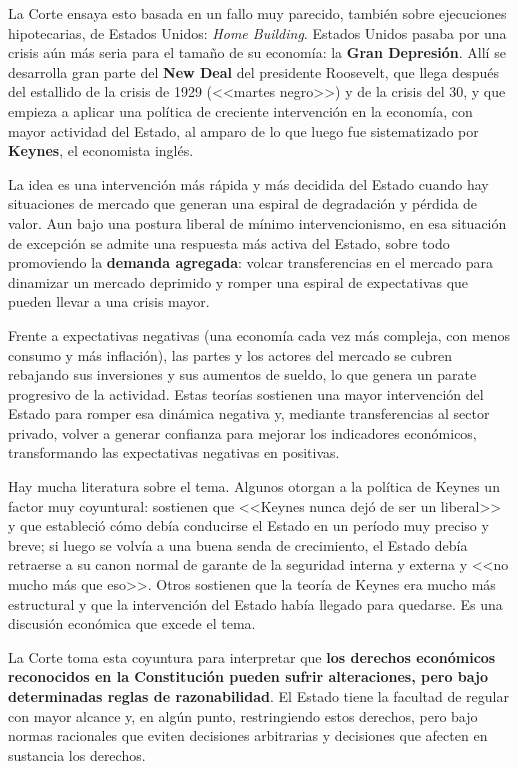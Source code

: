 \documentclass[12pt,oneside]{book}
\begin{document}

La Corte ensaya esto basada en un fallo muy parecido, también sobre ejecuciones hipotecarias, de Estados Unidos: \textit{Home Building}. Estados Unidos pasaba por una crisis aún más seria para el tamaño de su economía: la \textbf{Gran Depresión}. Allí se desarrolla gran parte del \textbf{New Deal} del presidente Roosevelt, que llega después del estallido de la crisis de 1929 (<<martes negro>>) y de la crisis del 30, y que empieza a aplicar una política de creciente intervención en la economía, con mayor actividad del Estado, al amparo de lo que luego fue sistematizado por \textbf{Keynes}, el economista inglés.

La idea es una intervención más rápida y más decidida del Estado cuando hay situaciones de mercado que generan una espiral de degradación y pérdida de valor. Aun bajo una postura liberal de mínimo intervencionismo, en esa situación de excepción se admite una respuesta más activa del Estado, sobre todo promoviendo la \textbf{demanda agregada}: volcar transferencias en el mercado para dinamizar un mercado deprimido y romper una espiral de expectativas que pueden llevar a una crisis mayor.

Frente a expectativas negativas (una economía cada vez más compleja, con menos consumo y más inflación), las partes y los actores del mercado se cubren rebajando sus inversiones y sus aumentos de sueldo, lo que genera un parate progresivo de la actividad. Estas teorías sostienen una mayor intervención del Estado para romper esa dinámica negativa y, mediante transferencias al sector privado, volver a generar confianza para mejorar los indicadores económicos, transformando las expectativas negativas en positivas.

Hay mucha literatura sobre el tema. Algunos otorgan a la política de Keynes un factor muy coyuntural: sostienen que <<Keynes nunca dejó de ser un liberal>> y que estableció cómo debía conducirse el Estado en un período muy preciso y breve; si luego se volvía a una buena senda de crecimiento, el Estado debía retraerse a su canon normal de garante de la seguridad interna y externa y <<no mucho más que eso>>. Otros sostienen que la teoría de Keynes era mucho más estructural y que la intervención del Estado había llegado para quedarse. Es una discusión económica que excede el tema.

\begin{important}
La Corte toma esta coyuntura para interpretar que \textbf{los derechos económicos reconocidos en la Constitución pueden sufrir alteraciones, pero bajo determinadas reglas de razonabilidad}. El Estado tiene la facultad de regular con mayor alcance y, en algún punto, restringiendo estos derechos, pero bajo normas racionales que eviten decisiones arbitrarias y decisiones que afecten en sustancia los derechos.
\end{important}
\end{document}
